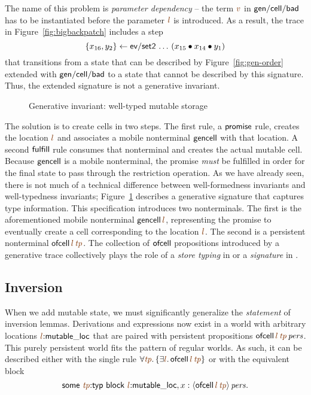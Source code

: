 The name of this problem is {\it parameter dependency} -- the term
$\lf{v}$ in ${\sf gen/cell/bad}$ has to be instantiated before the
parameter $\lf{l}$ is introduced. As a result, the trace in
Figure~\ref{fig:bigbackpatch} includes a step
\[\{{x_{16},y_2}\} \leftarrow {{\sf
    ev/set2}\,\ldots\,({x_{15}} \mathbin{\bullet}{{x_{14}} \mathbin{\bullet}{y_1}})}\] that
transitions from a state that can be described by
Figure~\ref{fig:gen-order} extended with ${\sf gen/cell/bad}$ to a
state that cannot be described by this signature. Thus, the extended
signature is not a generative invariant.

\begin{figure}[t]
\caption{Generative invariant: well-typed mutable storage}
\label{fig:gen-state} 
\end{figure}

The solution is to create cells in two steps. The first rule, a ${\sf
  promise}$ rule, creates the location $\lf{l}$ and associates a mobile
nonterminal ${\sf gencell}$ with that location. A second ${\sf
  fulfill}$ rule consumes that nonterminal and creates the actual
mutable cell.  Because ${\sf gencell}$ is a mobile nonterminal, the
promise {\it must} be fulfilled in order for the final state to pass
through the restriction operation. As we have already seen,
there is not much of a technical difference between well-formedness
invariants and well-typedness invariants; Figure~\ref{fig:gen-state}
describes a generative signature that captures type information. 
This specification introduces
two nonterminals. The first is the aforementioned mobile nonterminal
${\sf gencell}\,\lf{l}$, representing the promise to
eventually create a cell corresponding to the location $\lf{l}$.  
The second is a
persistent nonterminal ${\sf ofcell}\,\lf{l}\,\lf{\it tp}$. The
collection of ${\sf ofcell}$ propositions introduced by a generative
trace collectively plays the role of a {\it store typing} in
\cite[Chapter 13]{pierce02types} or a {\it signature} in \cite[Chapter
35]{harper12practical}.

\subsection{Inversion}

When we add mutable state, we must significantly generalize the 
{\it statement} of inversion lemmas. Derivations and
expressions now exist in a world with arbitrary locations $\lf{l}{:}{\sf
  mutable\_loc}$ that are paired with persistent propositions
$\ispers{{\sf ofcell}\,\lf{l}\,\lf{\it tp}}$. 
This purely persistent
world fits the pattern of regular worlds. 
As such, it can be described either with the
single rule
$\forall \lf{\it tp}.\,\{ \exists \lf{l}.\,{\sf
    ofcell}\,\lf{l}\,\lf{\it tp}\}$ or with the equivalent block
\[{\sf some} ~ \lf{\it tp}{:}{\sf
  typ} ~ {\sf block} ~ \lf{l}{:}{\sf mutable\_loc}, x : \ispers{\susp{{\sf
    ofcell}\,\lf{l}\,\lf{\it tp}}}.\]


